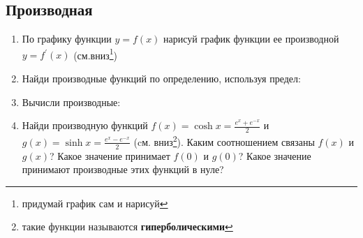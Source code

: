 \subsection*{Производная}
\begin{enumerate}
    \item По графику функции $y = f(x)$ нарисуй график функции ее производной $y = f^{'}(x)$ (см.вниз\footnote{придумай график сам и нарисуй})
    \item Найди производные функций по определению, используя предел:
    \item Вычисли производные:
    \item Найди производную функций $f(x) = \cosh x = \frac{e^x + e^{-x}}{2}$ и $g(x) = \sinh x = \frac{e^x - e^{-x}}{2}$ (cм. вниз\footnote{такие функции называются \textbf{гиперболическими}}). Каким соотношением связаны $f(x)$ и $g(x)$? Какое значение принимает $f(0)$ и $g(0)$? Какое значение принимают производные этих функций в нуле?

\end{enumerate}
